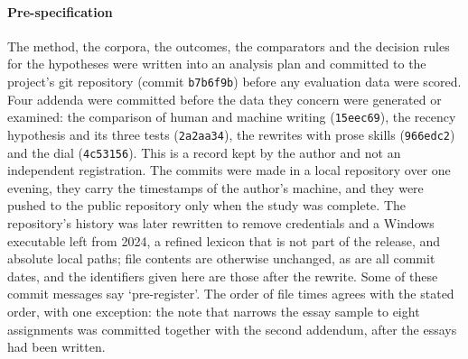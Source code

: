 \paragraph{Pre-specification}
The method, the corpora, the outcomes, the comparators and the decision rules for the hypotheses were written into an analysis plan and committed to the project's git repository (commit \texttt{b7b6f9b}) before any evaluation data were scored. Four addenda were committed before the data they concern were generated or examined: the comparison of human and machine writing (\texttt{15eec69}), the recency hypothesis and its three tests (\texttt{2a2aa34}), the rewrites with prose skills (\texttt{966edc2}) and the dial (\texttt{4c53156}). This is a record kept by the author and not an independent registration. The commits were made in a local repository over one evening, they carry the timestamps of the author's machine, and they were pushed to the public repository only when the study was complete. The repository's history was later rewritten to remove credentials and a Windows executable left from 2024, a refined lexicon that is not part of the release, and absolute local paths; file contents are otherwise unchanged, as are all commit dates, and the identifiers given here are those after the rewrite. Some of these commit messages say `pre-register'. The order of file times agrees with the stated order, with one exception: the note that narrows the essay sample to eight assignments was committed together with the second addendum, after the essays had been written.

